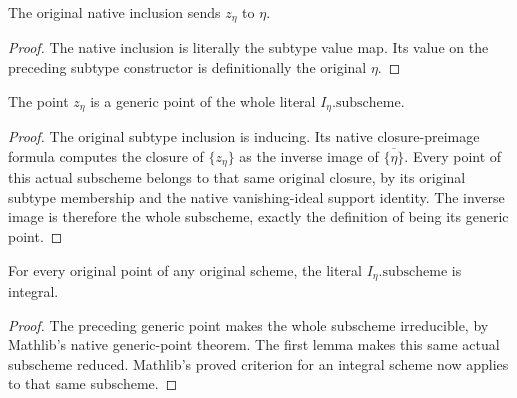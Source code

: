 \begin{lemma}
\label{lem:scheme-point-closure-canonical-lift-image}
\leanok
{}
The original native inclusion sends $z_\eta$ to $\eta$.
\end{lemma}
\begin{proof}
The native inclusion is literally the subtype value map. Its value on the
preceding subtype constructor is definitionally the original $\eta$.
\end{proof}

\begin{theorem}
\label{thm:scheme-point-closure-canonical-lift-generic}
\leanok
{}
The point $z_\eta$ is a generic point of the whole literal
$I_\eta.\mathrm{subscheme}$.
\end{theorem}
\begin{proof}
The original subtype inclusion is inducing. Its native closure-preimage
formula computes the closure of $\{z_\eta\}$ as the inverse image of
$\overline{\{\eta\}}$. Every point of this actual subscheme belongs to that
same original closure, by its original subtype membership and the native
vanishing-ideal support identity. The inverse image is therefore the whole
subscheme, exactly the definition of being its generic point.
\end{proof}

\begin{theorem}
\label{thm:scheme-point-closure-integral}
\leanok
{}
For every original point of any original scheme, the literal
$I_\eta.\mathrm{subscheme}$ is integral.
\end{theorem}
\begin{proof}
The preceding generic point makes the whole subscheme irreducible,
by Mathlib's native generic-point theorem. The first lemma makes
this same actual subscheme reduced. Mathlib's proved criterion
for an integral scheme now applies to that same subscheme.
\end{proof}
